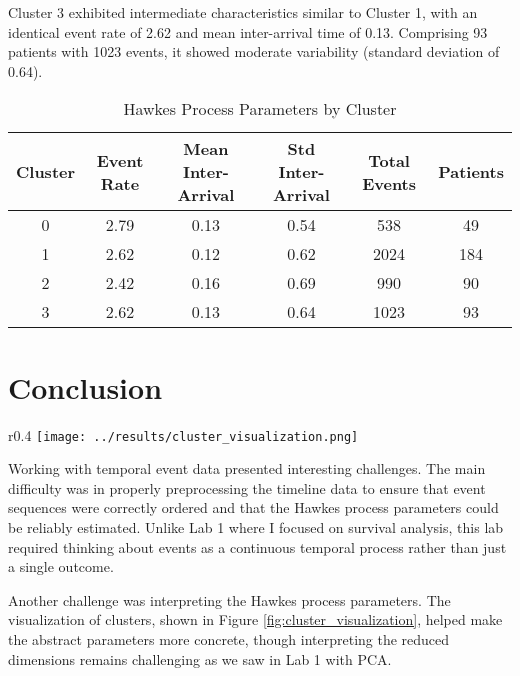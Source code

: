 \documentclass[a4paper,12pt]{article}
\begin{document}
\noindent
Cluster 3 exhibited intermediate characteristics similar to Cluster 1, with an identical event rate of 2.62 and mean inter-arrival time of 0.13. Comprising 93 patients with 1023 events, it showed moderate variability (standard deviation of 0.64).

\begin{table}[h]
  \centering
  \begin{tabular}{|c|c|c|c|c|c|}
    \hline
    Cluster & Event Rate & Mean Inter-Arrival & Std Inter-Arrival & Total Events & Patients \\
    \hline
    0       & 2.79       & 0.13               & 0.54              & 538          & 49       \\
    1       & 2.62       & 0.12               & 0.62              & 2024         & 184      \\
    2       & 2.42       & 0.16               & 0.69              & 990          & 90       \\
    3       & 2.62       & 0.13               & 0.64              & 1023         & 93       \\
    \hline
  \end{tabular}
  \caption{Hawkes Process Parameters by Cluster}
  \label{tab:hawkes_parameters}
\end{table}

\section{Conclusion}

\begin{wrapfigure}{r}{0.4\linewidth}
  \centering
  \texttt{[image: ../results/cluster\_visualization.png]}
  \caption{Cluster Visualization}
  \label{fig:cluster_visualization}
\end{wrapfigure}

Working with temporal event data presented interesting challenges. The main difficulty was in properly preprocessing the timeline data to ensure that event sequences were correctly ordered and that the Hawkes process parameters could be reliably estimated. Unlike Lab 1 where I focused on survival analysis, this lab required thinking about events as a continuous temporal process rather than just a single outcome.

Another challenge was interpreting the Hawkes process parameters. The visualization of clusters, shown in Figure \ref{fig:cluster_visualization}, helped make the abstract parameters more concrete, though interpreting the reduced dimensions remains challenging as we saw in Lab 1 with PCA.
\end{document}
